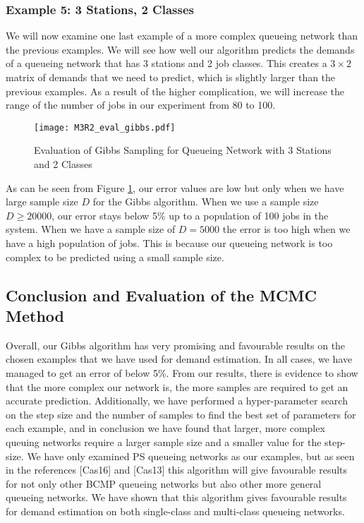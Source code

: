 \documentclass[a4paper,11pt,titlepage]{article}
\begin{document}
\subsubsection{Example 5: 3 Stations, 2 Classes}

We will now examine one last example of a more complex queueing network than the previous examples. We will see how well our algorithm predicts the demands of a queueing network that has 3 stations and 2 job classes. This creates a $3 \times 2$ matrix of demands that we need to predict, which is slightly larger than the previous examples. As a result of the higher complication, we will increase the range of the number of jobs in our experiment from 80 to 100. \\

\begin{figure}[h!]
\begin{center}
\texttt{[image: M3R2\_eval\_gibbs.pdf]}
\caption{Evaluation of Gibbs Sampling for Queueing Network with 3 Stations and 2 Classes}
\label{fig:M3R2_eval_gibbs}
\end{center}
\end{figure}

As can be seen from Figure \ref{fig:M3R2_eval_gibbs}, our error values are low but only when we have large sample size $D$ for the Gibbs algorithm. When we use a sample size $D \geq 20000$, our error stays below 5\% up to a population of 100 jobs in the system. When we have a sample size of $D=5000$ the error is too high when we have a high population of jobs. This is because our queueing network is too complex to be predicted using a small sample size. 

\subsection{Conclusion and Evaluation of the MCMC Method}

Overall, our Gibbs algorithm has very promising and favourable results on the chosen examples that we have used for demand estimation. In all cases, we have managed to get an error of below 5\%. From our results, there is evidence to show that the more complex our network is, the more samples are required to get an accurate prediction. Additionally, we have performed a hyper-parameter search on the step size and the number of samples to find the best set of parameters for each example, and in conclusion we have found that larger, more complex queuing networks require a larger sample size and a smaller value for the step-size. We have only examined PS queueing networks as our examples, but as seen in the references [Cas16] and [Cas13] this algorithm will give favourable results for not only other BCMP queueing networks but also other more general queueing networks. We have shown that this algorithm gives favourable results for demand estimation on both single-class and multi-class queueing networks. 
\end{document}
